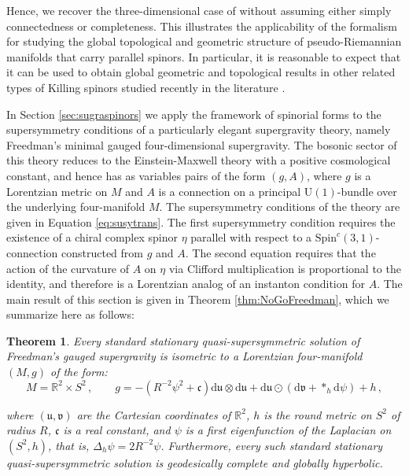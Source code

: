 \documentclass[10pt,a4paper,twoside,reqno]{amsart}
\theoremstyle{plain}
\newtheorem{thm}{Theorem}[section]
\theoremstyle{definition}
\theoremstyle{remark}
\def\dd{\mathrm{d}}
\def\Spin{\mathrm{Spin}}
\def\Spin{\mathrm{Spin}}
\def\U{\mathrm{U}}
\def\dd{\mathrm{d}}
\def\fru{\mathfrak{u}}
\def\frv{\mathfrak{v}}
\def\frc{\mathfrak{F}}
\def\frc{\mathfrak{c}}
\begin{document}
Hence, we recover the three-dimensional case of \cite[Thm.\ 4.1]{Moroianu1997} without assuming either simply connectedness or completeness. This illustrates the applicability of the formalism for studying the global topological and geometric structure of pseudo-Riemannian manifolds that carry parallel spinors. In particular, it is reasonable to expect that it can be used to obtain global geometric and topological results in other related types of Killing spinors studied recently in the literature \cite{Grosse_Nakad_2015,Lockman_2025,Carmona_2026}.\medskip

In Section \ref{sec:sugraspinors} we apply the framework of spinorial forms to the supersymmetry conditions of a particularly elegant supergravity theory, namely Freedman's minimal gauged four-dimensional supergravity. The bosonic sector of this theory reduces to the Einstein-Maxwell theory with a positive cosmological constant, and hence has as variables pairs of the form $(g,A)$, where $g$ is a Lorentzian metric on $M$ and $A$ is a connection on a principal $\U(1)$-bundle over the underlying four-manifold $M$. The supersymmetry conditions of the theory are given in Equation \eqref{eq:susytrans}. The first supersymmetry condition requires the existence of a chiral complex spinor $\eta$ parallel with respect to a $\Spin^c(3,1)$-connection constructed from $g$ and $A$. The second equation requires that the action of the curvature of $A$ on $\eta$ via Clifford multiplication is proportional to the identity, and therefore is a Lorentzian analog of an instanton condition for $A$. The main result of this section is given in Theorem \ref{thm:NoGoFreedman}, which we summarize here as follows:

\begin{thm}
Every standard stationary quasi-supersymmetric solution of Freedman's gauged supergravity is isometric to a Lorentzian four-manifold $(M,g)$ of the form:
\begin{equation*}
M = \mathbb{R}^2\times S^2 \, , \qquad g =  -(R^{-2}\psi^2+\frc)\dd\fru\otimes \dd\fru + \dd \fru \odot ( \dd\frv +  \ast_h\dd\psi) + h\, ,
\end{equation*}

\noindent
where $(\fru,\frv)$ are the Cartesian coordinates of $\mathbb{R}^2$, $h$ is the round metric on $S^2$ of radius $R$, $\frc$ is a real constant, and $\psi$ is a first eigenfunction of the Laplacian on $(S^2,h)$, that is, $\Delta_h\psi=2R^{-2}\psi$. Furthermore, every such standard stationary quasi-supersymmetric solution is geodesically complete and globally hyperbolic.
\end{thm} 
\end{document}
